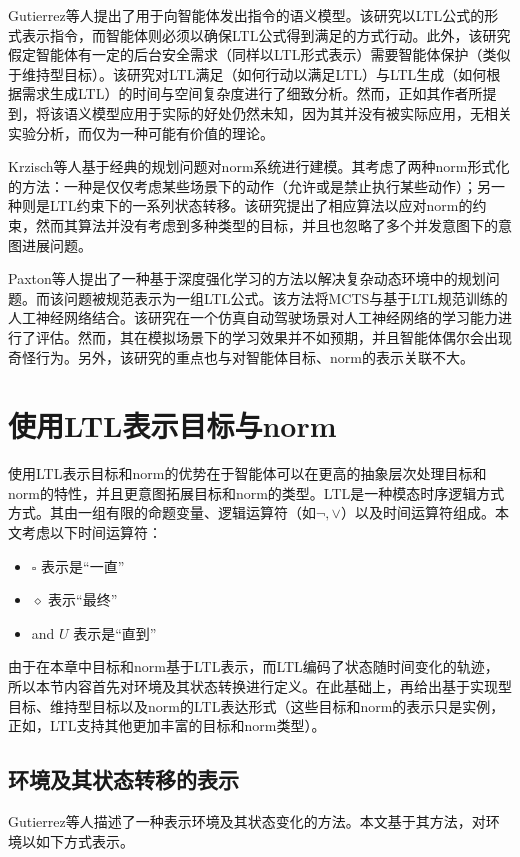 Gutierrez等人\cite{DBLP:conf/time/0001KPW22}提出了用于向智能体发出指令的语义模型。该研究以LTL公式的形式表示指令，而智能体则必须以确保LTL公式得到满足的方式行动。此外，该研究假定智能体有一定的后台安全需求（同样以LTL形式表示）需要智能体保护（类似于维持型目标）。该研究对LTL满足（如何行动以满足LTL）与LTL生成（如何根据需求生成LTL）的时间与空间复杂度进行了细致分析。然而，正如其作者所提到，将该语义模型应用于实际的好处仍然未知，因为其并没有被实际应用，无相关实验分析，而仅为一种可能有价值的理论。

Krzisch等人\cite{Krzisch2016}基于经典的规划问题对norm系统进行建模。其考虑了两种norm形式化的方法：一种是仅仅考虑某些场景下的动作（允许或是禁止执行某些动作）；另一种则是LTL约束下的一系列状态转移。该研究提出了相应算法以应对norm的约束，然而其算法并没有考虑到多种类型的目标，并且也忽略了多个并发意图下的意图进展问题。

Paxton等人\cite{DBLP:journals/corr/PaxtonRHK17}提出了一种基于深度强化学习的方法以解决复杂动态环境中的规划问题。而该问题被规范表示为一组LTL公式。该方法将MCTS与基于LTL规范训练的人工神经网络结合。该研究在一个仿真自动驾驶场景对人工神经网络的学习能力进行了评估。然而，其在模拟场景下的学习效果并不如预期，并且智能体偶尔会出现奇怪行为。另外，该研究的重点也与对智能体目标、norm的表示关联不大。


\section{使用LTL表示目标与norm}
使用LTL表示目标和norm的优势在于智能体可以在更高的抽象层次处理目标和norm的特性，并且更意图拓展目标和norm的类型。LTL是一种模态时序逻辑方式方式。其由一组有限的命题变量、逻辑运算符（如$\lnot, \lor$）以及时间运算符组成。本文考虑以下时间运算符：
\begin{itemize}
    \item $\square$ 表示是“一直”
    \item $\diamond$ 表示“最终”
    \item and $U$ 表示是“直到”
\end{itemize}
由于在本章中目标和norm基于LTL表示，而LTL编码了状态随时间变化的轨迹，所以本节内容首先对环境及其状态转换进行定义。在此基础上，再给出基于实现型目标、维持型目标以及norm的LTL表达形式（这些目标和norm的表示只是实例，正如\cite{DBLP:conf/atal/DastaniRW11}，LTL支持其他更加丰富的目标和norm类型）。

\subsection{环境及其状态转移的表示}
Gutierrez等人\cite{DBLP:conf/time/0001KPW22}描述了一种表示环境及其状态变化的方法。本文基于其方法，对环境以如下方式表示。

